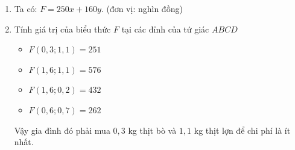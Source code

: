 \begin{bt}
{\begin{enumerate}
{}
					\begin{itemize}
						\item $A(0{,}3;1{,}1)=\left( {{d}_{1}} \right)\cap \left( {{d}_{4}} \right)$
						\item $B\left( 1{,}6;1{,}1 \right)=\left( {{d}_{3}} \right)\cap \left( {{d}_{4}} \right)$
						\item $C\left( 1{,}6;0{,}2 \right)=\left( {{d}_{2}} \right)\cap \left( {{d}_{3}} \right)$
						\item $D\left( 0{,}6;0{,}7 \right)=\left( {{d}_{1}} \right)\cap \left( {{d}_{2}} \right)$
					\end{itemize}
					Vậy miền nghiệm của hệ $(*)$ là miền trong của tứ giác $ABCD$ với tọa độ các đỉnh là $A(0{,}3;1{,}1)$; $B\left( 1{,}6;1{,}1 \right)$; $C\left( 1{,}6;0{,}2 \right)$; $D\left( 0{,}6;0{,}7 \right)$ kể cả các bờ $AB,BC,CD,DA$.
					\item  Ta có: $F=250x+160y$. (đơn vị: nghìn đồng)
					\item Tính giá trị của biểu thức $F$ tại các đỉnh của tứ giác $ABCD$
					\begin{itemize}
						\item $F\left( 0{,}3;1{,}1 \right)=251$
						\item $F\left( 1{,}6;1{,}1 \right)=576$
						\item $F\left( 1{,}6;0{,}2 \right)=432$
						\item $F\left( 0{,}6;0{,}7 \right)=262$
					\end{itemize} 
					Vậy gia đình đó phải mua $0{,}3$ kg thịt bò và $1{,}1$ kg thịt lợn để chi phí là ít nhất.
				\end{enumerate}
			}
		\end{bt}

